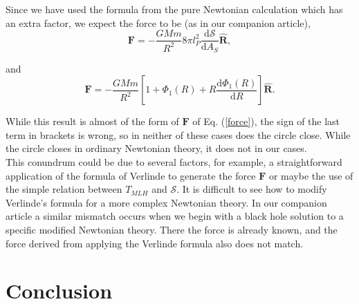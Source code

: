 \documentclass[nofootinbib,aps,prd,preprint,groupedaddress,showpacs,showkeys]{revtex4-1}
\newcommand{\dif}{\mathrm{d}}
\begin{document}
\noindent Since we have used the formula from the pure Newtonian calculation which has an extra factor, we expect the force to be (as in our companion article),
\begin{equation}
\mathbf{F} = - \frac{GMm}{R^2} 8 \pi l_P^2 \frac{\dif \mathcal{S}}{\dif A_S} \hat{\mathbf{R}},
\end{equation}

\noindent and
\begin{equation}
\mathbf{F} = -\frac{GMm}{R^2} \left[1 + \Phi_1(R) + R \frac{\dif \Phi_1(R)}{\dif R} \right] \hat{\mathbf{R}}.
\end{equation}

\noindent While this result is almost of the form of $\mathbf{F}$ of Eq. (\ref{force}), the sign of the last term in brackets is wrong, so in neither of these cases does the circle close. While the circle closes in ordinary Newtonian theory, it does not in our cases.\\
\indent This conundrum could be due to several factors, for example, a straightforward application of the formula of Verlinde to generate the force $\mathbf{F}$ or maybe the use of the simple relation between $T_{MLH}$ and $\mathcal{S}$. It is difficult to see how to modify Verlinde's formula for a more complex Newtonian theory. In our companion article a similar mismatch occurs when we begin with a black hole solution to a specific modified Newtonian theory. There the force is already known, and the force derived from applying the Verlinde formula also does not match.

\section{Conclusion}
\end{document}
